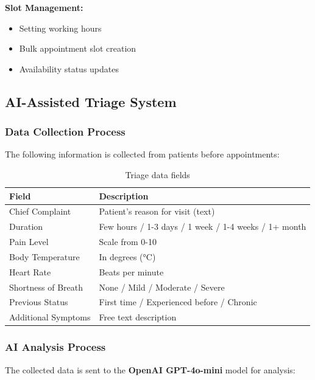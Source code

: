 \documentclass[12pt,a4paper]{article}
\begin{document}
\textbf{Slot Management:}
\begin{itemize}
    \item Setting working hours
    \item Bulk appointment slot creation
    \item Availability status updates
\end{itemize}

\subsection{AI-Assisted Triage System}

\subsubsection{Data Collection Process}
The following information is collected from patients before appointments:

\begin{table}[h!]
\centering
\begin{tabular}{|l|p{8cm}|}
\hline
\textbf{Field} & \textbf{Description} \\
\hline
Chief Complaint & Patient's reason for visit (text) \\
\hline
Duration & Few hours / 1-3 days / 1 week / 1-4 weeks / 1+ month \\
\hline
Pain Level & Scale from 0-10 \\
\hline
Body Temperature & In degrees (°C) \\
\hline
Heart Rate & Beats per minute \\
\hline
Shortness of Breath & None / Mild / Moderate / Severe \\
\hline
Previous Status & First time / Experienced before / Chronic \\
\hline
Additional Symptoms & Free text description \\
\hline
\end{tabular}
\caption{Triage data fields}
\end{table}

\subsubsection{AI Analysis Process}
The collected data is sent to the \textbf{OpenAI GPT-4o-mini} model for analysis:
\end{document}
